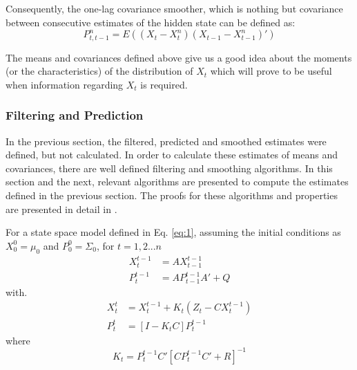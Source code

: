 \documentclass{article}
\begin{document}
Consequently, the one-lag covariance smoother, which is nothing but covariance between consecutive estimates of the hidden state can be defined as:
\begin{equation} \label{eq:5}
  P_{t,t-1}^{n} = E((X_t-X_{t}^{n})(X_{t-1}-X_{t-1}^{n})')  
\end{equation}

The means and covariances defined above give us a good idea about the moments (or the characteristics) of the distribution of $X_t$ which will prove to be useful when information regarding $X_t$ is required. 

\subsubsection{Filtering and Prediction}\label{ssec:filtering}
In the previous section, the filtered, predicted and smoothed estimates were defined, but not calculated. In order to calculate these estimates of means and covariances, there are well defined filtering and smoothing algorithms. In this section and the next, relevant algorithms are presented to compute the estimates defined in the previous section. The proofs for these algorithms and properties are presented in detail in \cite{shumstof2000}. 

For a state space model defined in Eq. \ref{eq:1}, assuming the initial conditions as $X_0^0=\mu_0$ and $P_0^0=\Sigma_0$, for $t=1,2...n$
\begin{equation} \label{eq:6}
    \begin{split}
        X_t^{t-1} &= AX_{t-1}^{t-1}\\
        P_t^{t-1} &= AP_{t-1}^{t-1}A' + Q
    \end{split}
\end{equation}
with.
\begin{equation}\label{eq:7}
    \begin{split}
        X_t^{t} &= X_t^{t-1} + K_t(Z_t-CX_t^{t-1})\\
        P_t^{t} &= [I-K_tC]P_t^{t-1}
    \end{split}
\end{equation}
where 
\begin{equation}\label{eq:8}
    K_t = P_t^{t-1}C'[CP_t^{t-1}C' + R]^{-1}
\end{equation}
\end{document}
